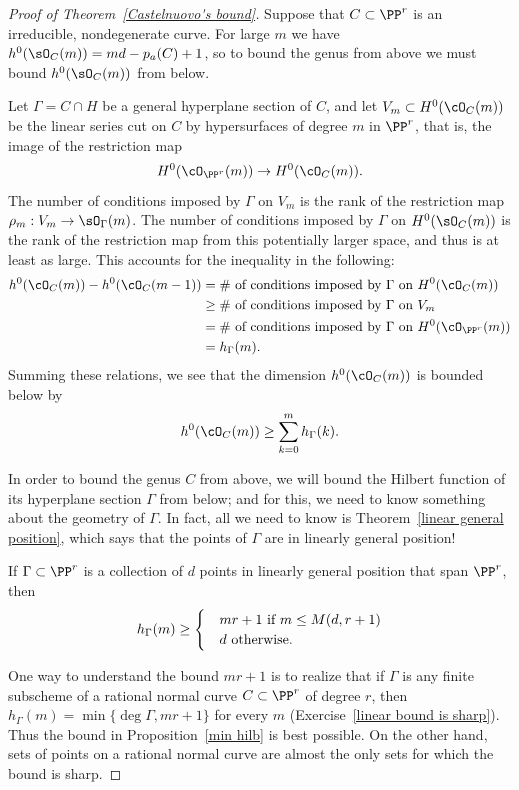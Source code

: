 \begin{proof}[Proof of Theorem~\ref{Castelnuovo's bound}]
Suppose that $C \subset \PP^r$ is an irreducible, nondegenerate curve. For large $m$ we have
$h^{0}(\sO_{C}(m)) = md-p_{a}(C) +1$, so to bound the genus from above we must
bound $h^{0}(\sO_{C}(m))$ from below.

Let $\Gamma = C \cap H$ be a general hyperplane section of $C$, and let $V_m \subset H^0(\cO_C(m))$ be the linear series cut on $C$ by hypersurfaces of degree $m$ in $\PP^r$, that is, the image of the restriction map
$$
H^0(\cO_{\PP^r}(m)) \to H^0(\cO_C(m)).
$$
The number of  conditions imposed by $\Gamma$ on $V_m$ is the rank of the restriction map 
$\rho_m: V_m \to \sO_\Gamma(m)$. 
 The number of conditions imposed by $\Gamma$ on $H^{0}(\sO_{C}(m))$ is the 
 rank of the restriction map from this potentially larger space, and thus is at least as large. This 
 accounts for the inequality in the following:
\begin{align*}
h^0(\cO_C(m)) - h^0(\cO_C(m-1)) & = \text{\# of conditions imposed by $\Gamma$ on $H^0(\cO_C(m))$}\\
&\geq \text{\# of conditions imposed by $\Gamma$ on $V_m$} \\
&= \text{\# of conditions imposed by $\Gamma$ on $H^0(\cO_{\PP^r}(m))$} \\
&= h_\Gamma(m).
\end{align*}
Summing these relations, we see that the dimension $h^0(\cO_C(m))$ is bounded below by
$$
h^0(\cO_C(m)) \geq \sum_{k=0}^m h_\Gamma(k).
$$

In order to bound the genus $C$ from above, we will bound the Hilbert function of its hyperplane section $\Gamma$  from below; and for this, we need to know something about the geometry of $\Gamma$. In fact, all we need to know is Theorem~\ref{linear general position}, which says that the points of $\Gamma$ are in linearly general position! 

\begin{proposition}\label{min hilb}
If $\Gamma \subset \PP^r$ is a collection of $d$ points in linearly general position that span $\PP^r$, then 
$$
h_\Gamma(m) \geq 
\begin{cases}
&mr+1\hbox{ if $m\leq M(d,r+1)$}\\
&d \hbox{ otherwise.}
\end{cases}
$$
\end{proposition}

One way to understand the bound $mr+1$ is to realize that if $\Gamma$ is any finite subscheme of a rational normal curve $C\subset\PP^r$ of degree $r$, 
then $h_\Gamma(m) = \min\{\deg \Gamma, mr+1\}$ for every $m$ (Exercise~\ref{linear bound is sharp}).
  Thus the bound in Proposition~\ref{min hilb} is best possible.
On the other hand, sets of points on a rational normal curve are almost the only sets for which the bound is sharp.


\end{proof}
